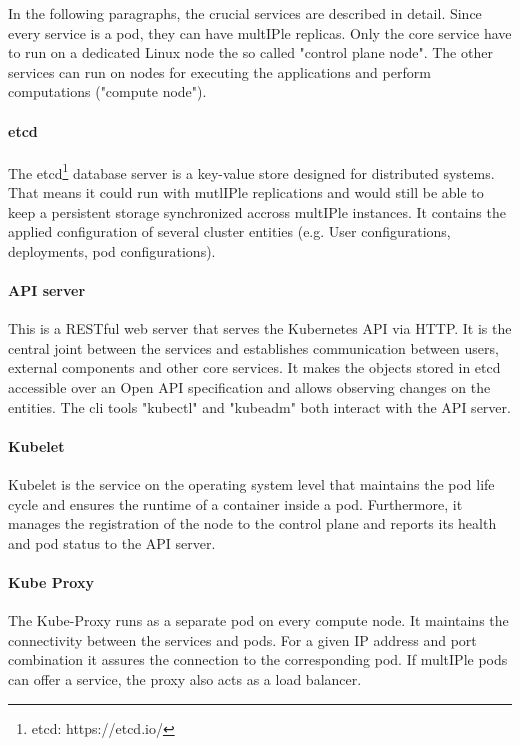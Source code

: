 In the following paragraphs, the crucial services are described in detail. Since every service is a pod, they can have mult\ac{IP}le replicas. Only the core service have to run on a dedicated Linux node the so called "control plane node". The other services can run on nodes for executing the applications and perform computations ("compute node").

\paragraph{etcd}
The etcd\footnote{etcd: https://etcd.io/} database server is a key-value store designed for distributed systems\cite{Luksa.2018}. That means it could run with mutl\ac{IP}le replications and would still be able to keep a persistent storage synchronized accross mult\ac{IP}le instances. It contains the applied configuration of several cluster entities (e.g. User configurations, deployments, pod configurations).

\paragraph{API server}
This is a RESTful web server that serves the Kubernetes API via HTTP\cite{Kubernetes.20221024}. It is the central joint between the services and establishes communication between users, external components and other core services. It makes the objects stored in etcd accessible over an Open API specification\cite{Luksa.2018,OpenAPIInitiative.20230210} and allows observing changes on the entities. The \ac{cli} tools "kubectl" and "kubeadm" both interact with the API server.

\paragraph{Kubelet} Kubelet is the service on the operating system level that maintains the pod life cycle and ensures the runtime of a container inside a pod. Furthermore, it manages the registration of the node to the control plane and reports its health and pod status to the API server.

\paragraph{Kube Proxy} The Kube-Proxy runs as a separate pod on every compute node. It maintains the connectivity between the services and pods\cite{Luksa.2018}. For a given \ac{IP} address and port combination it assures the connection to the corresponding pod. If mult\ac{IP}le pods can offer a service, the proxy also acts as a load balancer\cite{Luksa.2018}.

